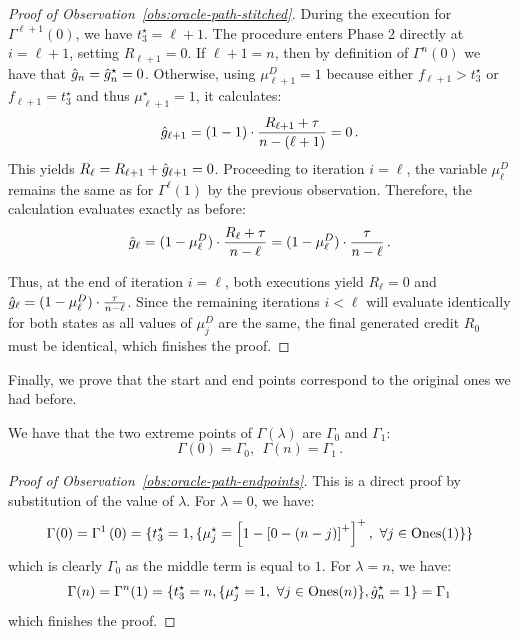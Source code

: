 \begin{proof}[Proof of Observation~\ref{obs:oracle-path-stitched}]
    During the execution for $\Gamma^{\ell+1}(0)$, we have $t_3^\star = \ell+1$. The procedure enters Phase 2 directly at $i = \ell+1$, setting $R_{\ell+1}=0$. If $\ell+1=n$, then by definition of $\Gamma^{n}(0)$ we have that $\hat{g}_n=\hat{g}_n^\star=0$. Otherwise, using $\mu_{\ell+1}^D = 1$ because either $f_{\ell+1}>t_3^\star$ or $f_{\ell+1}=t_3^\star$ and thus $\mu_{\ell+1}^\star=1$, it calculates:
    \begin{equation*}
        \hat{g}_{\ell+1} = (1 - 1) \cdot \frac{R_{\ell+1} + \tau}{n - (\ell+1)} = 0\,.
    \end{equation*}
    This yields $R_\ell = R_{\ell+1} + \hat{g}_{\ell+1} = 0$. Proceeding to iteration $i = \ell$, the variable $\mu_\ell^D$ remains the same as for $\Gamma^{\ell}(1)$ by the previous observation. Therefore, the calculation evaluates exactly as before:
    \begin{equation*}
        \hat{g}_\ell = (1 - \mu_\ell^D) \cdot \frac{R_\ell + \tau}{n - \ell} = (1 - \mu_\ell^D) \cdot\frac{\tau}{n - \ell}\,.
    \end{equation*}
    
    Thus, at the end of iteration $i=\ell$, both executions yield $R_\ell = 0$ and $\hat{g}_\ell = (1 - \mu_\ell^D) \cdot \frac{\tau}{n-\ell}$. Since the remaining iterations $i < \ell$ will evaluate identically for both states as all values of $\mu_j^D$ are the same, the final generated credit $R_0$ must be identical, which finishes the proof.
\end{proof}

Finally, we prove that the start and end points correspond to the original ones we had before.

\begin{observation}\label{obs:oracle-path-endpoints}
    We have that the two extreme points of $\Gamma(\lambda)$ are $\Gamma_0$ and $\Gamma_1$:
    \begin{equation*}
        \Gamma(0) = \Gamma_0, \ \ \Gamma(n)= \Gamma_1\,.
    \end{equation*}
\end{observation}
\begin{proof}[Proof of Observation~\ref{obs:oracle-path-endpoints}]
    This is a direct proof by substitution of the value of $\lambda$. For $\lambda=0$, we have:
    \begin{equation*}
        \Gamma(0) = \Gamma^1\left(0\right) = \{t_3^\star=1, \{\mu_j^\star=\left[1-\left[0 - (n-j)\right]^+\right]^+, \ \forall j\in \text{Ones}(1) \}\}
    \end{equation*}
    which is clearly $\Gamma_0$ as the middle term is equal to $1$. For $\lambda=n$, we have:
    \begin{equation*}
        \Gamma(n) = \Gamma^n(1) = \{t_3^\star=n, \{\mu_j^\star=1, \ \forall j\in \text{Ones}(n) \}, \hat{g}_n^\star = 1\} = \Gamma_1
    \end{equation*}
    which finishes the proof.
\end{proof}

